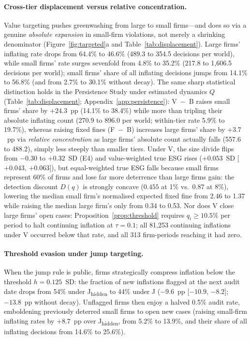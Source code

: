 \documentclass[11pt]{article}
\newcommand{\Jh}{J\textsubscript{hidden}}
\begin{document}
\paragraph{Cross-tier displacement versus relative concentration.}
Value targeting pushes greenwashing from large to small firms---and does so via a genuine \emph{absolute expansion} in small-firm violations, not merely a shrinking denominator (Figure~\ref{fig:targeted}a and Table~\ref{tab:displacement}). Large firms' inflating rate drops from 64.4\% to 46.6\% (489.3 to 354.5 decisions per world), while small firms' rate surges sevenfold from 4.8\% to 35.2\% (217.8 to 1,606.5 decisions per world); small firms' share of all inflating decisions jumps from 14.1\% to 56.8\% (and from 2.7\% to 30.1\% without decay). The same sharp statistical distinction holds in the Persistence Study under estimated dynamics $Q$ (Table~\ref{tab:displacement}; Appendix~\ref{app:persistence}): V~$-$~B raises small firms' share by $+24.3$~pp (14.1\% to 38.4\%) while more than tripling their absolute inflating count (270.9 to 896.0 per world; within-tier rate 5.9\% to 19.7\%), whereas raising fixed fines (F~$-$~B) increases large firms' share by $+3.7$~pp via \emph{relative concentration} as large firms' absolute count actually falls (557.6 to 488.2), simply less steeply than smaller tiers. Under V, the size divide flips from $-0.30$ to $+0.32$~SD (E4) and value-weighted true ESG rises ($+0.053$~SD [$+0.043$, $+0.063$]), but equal-weighted true ESG falls because small firms represent 60\% of firms and lose far more deterrence than large firms gain: the detection discount $D(q)$ is strongly concave ($0.455$ at 1\% vs.\ $0.87$ at 8\%), lowering the median small firm's normalised expected fixed fine from 2.46 to 1.37 while raising the median large firm's only from 0.34 to 0.53. Nor does V close large firms' open cases: Proposition~\ref{prop:threshold} requires $q_i \ge 10.5\%$ per period to halt continuing inflation at $\tau = 0.1$; all 81,253 continuing inflations under V occurred below that rate, and all 313 firm-periods reaching it had zero.

\paragraph{Threshold evasion under jump targeting.}
When the jump rule is public, firms strategically compress inflation below the threshold $h = 0.125$~SD: the fraction of new inflations flagged at the next audit date drops from 54\% under \Jh{} to 44\% under J ($-9.6$~pp [$-10.9$, $-8.2$]; $-13.8$~pp without decay). Unflagged firms then enjoy a halved 0.5\% audit rate, emboldening previously deterred small firms to open new cases (raising small-firm inflating rates by $+8.7$~pp over \Jh{}, from 5.2\% to 13.9\%, and their share of all inflating decisions from 14.6\% to 25.6\%).
\end{document}

